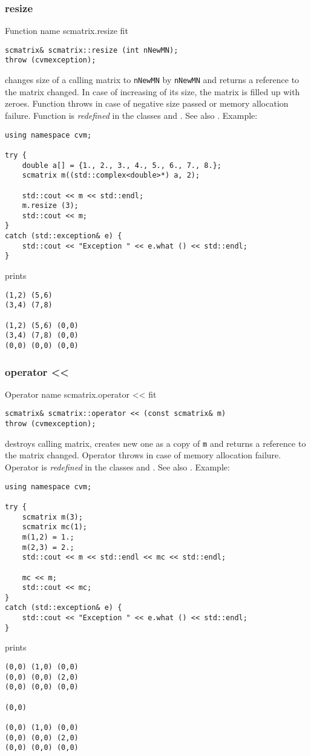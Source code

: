 \subsubsection{resize}
Function%
\pdfdest name {scmatrix.resize} fit
\begin{verbatim}
scmatrix& scmatrix::resize (int nNewMN);
throw (cvmexception);
\end{verbatim}
changes  size of a calling matrix to \verb"nNewMN" by \verb"nNewMN"
and returns a reference to
the matrix changed. In case of increasing of its size, the matrix
is filled up with zeroes.
Function throws  
in case of negative size passed or memory allocation failure.
Function is \emph{redefined} in the classes
and .
See also .
Example:
\begin{Verbatim}
using namespace cvm;

try {
    double a[] = {1., 2., 3., 4., 5., 6., 7., 8.};
    scmatrix m((std::complex<double>*) a, 2);

    std::cout << m << std::endl;
    m.resize (3);
    std::cout << m;
}
catch (std::exception& e) {
    std::cout << "Exception " << e.what () << std::endl;
}
\end{Verbatim}
prints
\begin{Verbatim}
(1,2) (5,6)
(3,4) (7,8)

(1,2) (5,6) (0,0)
(3,4) (7,8) (0,0)
(0,0) (0,0) (0,0)
\end{Verbatim}
\newpage





\subsubsection{operator <{}<}
Operator%
\pdfdest name {scmatrix.operator <<} fit
\begin{verbatim}
scmatrix& scmatrix::operator << (const scmatrix& m)
throw (cvmexception);
\end{verbatim}
destroys  calling matrix, creates  new one as a copy of \verb"m"
and returns a reference to
the matrix changed.
Operator throws  
in case of memory allocation failure.
Operator is \emph{redefined} in the classes
and .
See also .
Example:
\begin{Verbatim}
using namespace cvm;

try {
    scmatrix m(3);
    scmatrix mc(1);
    m(1,2) = 1.;
    m(2,3) = 2.;
    std::cout << m << std::endl << mc << std::endl;

    mc << m;
    std::cout << mc;
}
catch (std::exception& e) {
    std::cout << "Exception " << e.what () << std::endl;
}
\end{Verbatim}
prints
\begin{Verbatim}
(0,0) (1,0) (0,0)
(0,0) (0,0) (2,0)
(0,0) (0,0) (0,0)

(0,0)

(0,0) (1,0) (0,0)
(0,0) (0,0) (2,0)
(0,0) (0,0) (0,0)
\end{Verbatim}
\newpage




